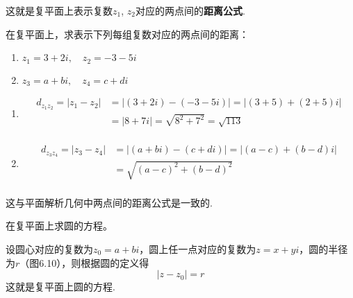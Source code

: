   这就是复平面上表示复数$z_1$, $z_2$对应的两点间的\textbf{距离公式}.


\begin{example}
在复平面上，求表示下列每组复数对应的两点间的距离：
\begin{multicols}{2}
 \begin{enumerate}[(1)]
\item $z_1=3+2i,\quad z_2=-3-5i$
\item $z_3=a+bi,\quad z_4=c+di$
\end{enumerate}   
\end{multicols}
\end{example}

\begin{solution}
\begin{enumerate}[(1)]
    \item \[\begin{split}
        d_{z_1z_2}=|z_1-z_2|&=|(3+2i)-(-3-5i)|=|(3+5)+(2+5)i|\\
        &=|8+7i|=\sqrt{8^2+7^2}=\sqrt{113}\\
    \end{split}\]
    \item \[\begin{split}
        d_{z_3z_4}=|z_3-z_4|&=|(a+bi)-(c+di)|=|(a-c)+(b-d)i|\\
        &=\sqrt{(a-c)^2+(b-d)^2}\\
    \end{split}\]
\end{enumerate}
这与平面解析几何中两点间的距离公式是一致的.
\end{solution}

    \begin{example}
    在复平面上求圆的方程。
\end{example}

\noindent
\begin{minipage}{.55\textwidth}
\begin{solution}
设圆心对应的复数为$z_0=a+bi$，圆上任一点对应的复数为$z=x+yi$，圆的半径为$r$（图6.10），则根据圆的定义得
\[|z-z_0|=r\]
这就是复平面上圆的方程.
\end{solution}
\end{minipage}
\begin{minipage}{.45\textwidth}
    \centering
\end{minipage}

